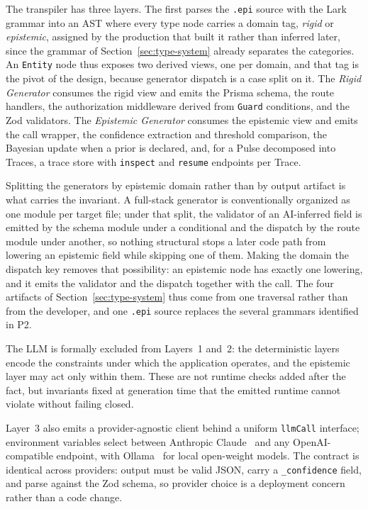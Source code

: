\documentclass[sigconf]{acmart}
\begin{document}
The transpiler has three layers. The first parses the \texttt{.epi} source with the Lark grammar into an AST where every type node carries a domain tag, \emph{rigid} or \emph{epistemic}, assigned by the production that built it rather than inferred later, since the grammar of Section~\ref{sec:type-system} already separates the categories. An \texttt{Entity} node thus exposes two derived views, one per domain, and that tag is the pivot of the design, because generator dispatch is a case split on it. The \emph{Rigid Generator} consumes the rigid view and emits the Prisma schema, the route handlers, the authorization middleware derived from \texttt{Guard} conditions, and the Zod validators. The \emph{Epistemic Generator} consumes the epistemic view and emits the call wrapper, the confidence extraction and threshold comparison, the Bayesian update when a prior is declared, and, for a Pulse decomposed into Traces, a trace store with \texttt{inspect} and \texttt{resume} endpoints per Trace.

Splitting the generators by epistemic domain rather than by output artifact is what carries the invariant. A full-stack generator is conventionally organized as one module per target file; under that split, the validator of an AI-inferred field is emitted by the schema module under a conditional and the dispatch by the route module under another, so nothing structural stops a later code path from lowering an epistemic field while skipping one of them. Making the domain the dispatch key removes that possibility: an epistemic node has exactly one lowering, and it emits the validator and the dispatch together with the call. The four artifacts of Section~\ref{sec:type-system} thus come from one traversal rather than from the developer, and one \texttt{.epi} source replaces the several grammars identified in P2.

The LLM is formally excluded from Layers~1 and~2: the deterministic layers encode the constraints under which the application operates, and the epistemic layer may act only within them. These are not runtime checks added after the fact, but invariants fixed at generation time that the emitted runtime cannot violate without failing closed.

Layer~3 also emits a provider-agnostic client behind a uniform \texttt{llmCall} interface; environment variables select between Anthropic Claude~\cite{anthropic} and any OpenAI-compatible endpoint, with Ollama~\cite{ollama} for local open-weight models. The contract is identical across providers: output must be valid JSON, carry a \texttt{\_confidence} field, and parse against the Zod schema, so provider choice is a deployment concern rather than a code change.
\end{document}
